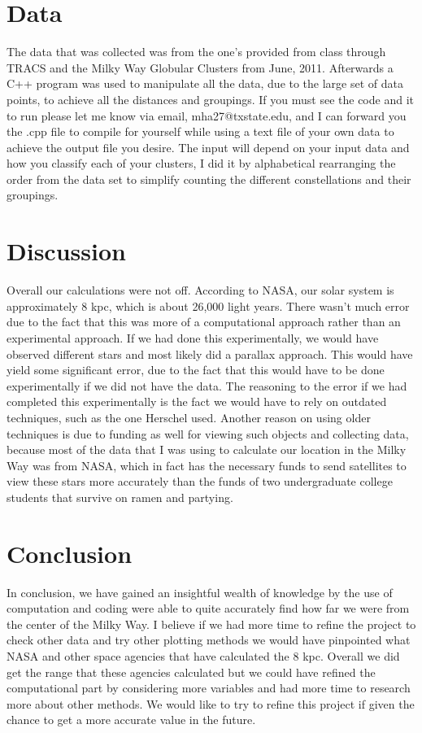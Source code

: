 \documentclass[%
 reprint,
 amsmath,amssymb,
 aps,
]{revtex4-1}
\begin{document}
\section{\label{sec:level3}Data}
The data that was collected was from the one's provided from class through TRACS and the Milky Way Globular Clusters from June, 2011. Afterwards a C++ program was used to manipulate all the data, due to the large set of data points, to achieve all the distances and groupings. If you must see the code and it to run please let me know via email, mha27@txstate.edu, and I can forward you the .cpp file to compile for yourself while using a text file of your own data to achieve the output file you desire. The input will depend on your input data and how you classify each of your clusters, I did it by alphabetical rearranging the order from the data set to simplify counting the different constellations and their groupings.

\section{\label{sec:level4}Discussion}
Overall our calculations were not off. According to NASA, our solar system is approximately 8 kpc, which is about 26,000 light years. There wasn't much error due to the fact that this was more of a computational approach rather than an experimental approach. If we had done this experimentally, we would have observed different stars and most likely did a parallax approach. This would have yield some significant error, due to the fact that this would have to be done experimentally if we did not have the data. The reasoning to the error if we had completed this experimentally is the fact we would have to rely on outdated techniques, such as the one Herschel used. Another reason on using older techniques is due to funding as well for viewing such objects and collecting data, because most of the data that I was using to calculate our location in the Milky Way was from NASA, which in fact has the necessary funds to send satellites to view these stars more accurately than the funds of two undergraduate college students that survive on ramen and partying. 

\section{\label{sec:level5}Conclusion}
In conclusion, we have gained an insightful wealth of knowledge by the use of computation and coding were able to quite accurately find how far we were from the center of the Milky Way. I believe if we had more time to refine the project to check other data and try other plotting methods we would have pinpointed what NASA and other space agencies that have calculated the 8 kpc. Overall we did get the range that these agencies calculated but we could have refined the computational part by considering more variables and had more time to research more about other methods. We would like to try to refine this project if given the chance to get a more accurate value in the future.
\end{document}
